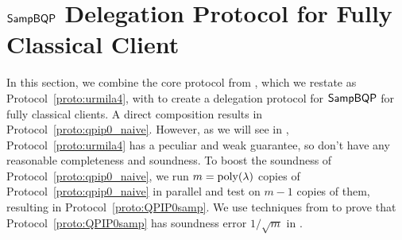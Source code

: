 \section{$\operatorname{\mathsf{SampBQP}}$ Delegation Protocol for Fully Classical Client}
\label{sec:qpip0_all}



In this section, we combine the core protocol from \cite{FOCS:Mahadev18a}, which we restate as Protocol~\ref{proto:urmila4}, with  to create a delegation protocol for $\operatorname{\mathsf{SampBQP}}$ for fully classical clients. A direct composition results in Protocol~\ref{proto:qpip0_naive}. However, as we will see in , Protocol~\ref{proto:urmila4} has a peculiar and weak guarantee, so  don't have any reasonable completeness and soundness. To boost the soundness of Protocol~\ref{proto:qpip0_naive}, we run $m=\operatorname*{\operatorname{poly}}(\lambda)$ copies of Protocol~\ref{proto:qpip0_naive} in parallel and test on $m-1$ copies of them, resulting in Protocol~\ref{proto:QPIP0samp}. We use techniques from \cite{arXiv:ChiaChungYam19} to prove that Protocol~\ref{proto:QPIP0samp} has soundness error $1/\sqrt{m}$ in .








